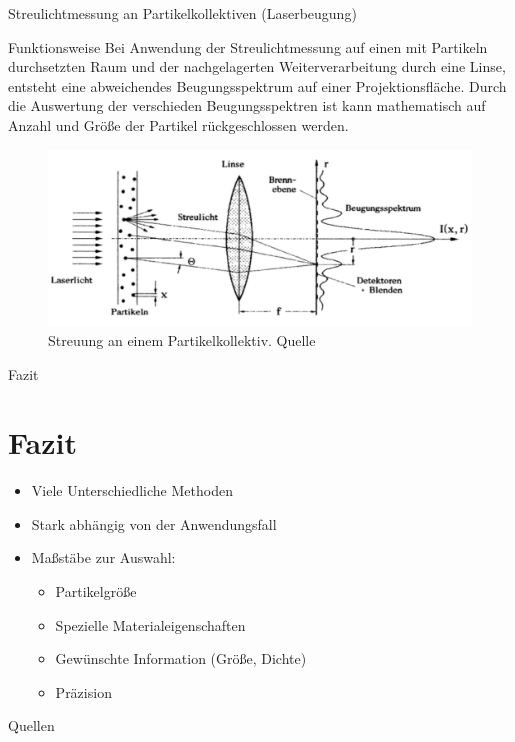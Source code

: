 \documentclass{beamer}
\begin{document}
	\begin{frame}{Streulichtmessung an Partikelkollektiven (Laserbeugung)}	
		\begin{block}{Funktionsweise}
			\footnotesize Bei Anwendung der Streulichtmessung auf einen mit Partikeln durchsetzten Raum und der nachgelagerten Weiterverarbeitung durch eine Linse, entsteht eine abweichendes Beugungsspektrum auf einer Projektionsfläche. Durch die Auswertung der verschieden Beugungsspektren ist kann mathematisch auf Anzahl und Größe der Partikel rückgeschlossen werden.
			\begin{figure}
				\includegraphics[width=0.8\textheight]{laser.pdf}
				\caption{\footnotesize{Streuung an einem Partikelkollektiv. Quelle\cite{messtechniken}}}
			\end{figure}
		\end{block}
	\end{frame}

	\begin{frame}{Fazit}
	\section{Fazit}
	\begin{itemize}
		\item Viele Unterschiedliche Methoden
		\item Stark abhängig von der Anwendungsfall
		\item Maßstäbe zur Auswahl:
		\begin{itemize}
			\item Partikelgröße
			\item Spezielle Materialeigenschaften
			\item Gewünschte Information (Größe, Dichte)
			\item Präzision
		\end{itemize}
	\end{itemize}
	\end{frame}
	
	\begin{frame}{Quellen}
		\begin{multicols}{2}
		\tiny{
			
			
		}
		\end{multicols}
	\end{frame}
	
\end{document}
